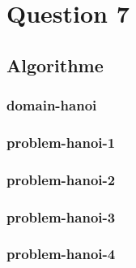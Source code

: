 \documentclass[../CSC_5RO16_TA_TP5.tex]{subfiles}
\begin{document}
\section{Question 7}
% 

\subsection{Algorithme}

\subsubsection{domain-hanoi}
\begin{scriptsize}\mycode
    
\end{scriptsize}

\subsubsection{problem-hanoi-1}
\begin{scriptsize}\mycode
    
\end{scriptsize}

\subsubsection{problem-hanoi-2}
\begin{scriptsize}\mycode
    
\end{scriptsize}

\subsubsection{problem-hanoi-3}
\begin{scriptsize}\mycode
    
\end{scriptsize}

\subsubsection{problem-hanoi-4}
\begin{scriptsize}\mycode
    
\end{scriptsize}
\end{document}
